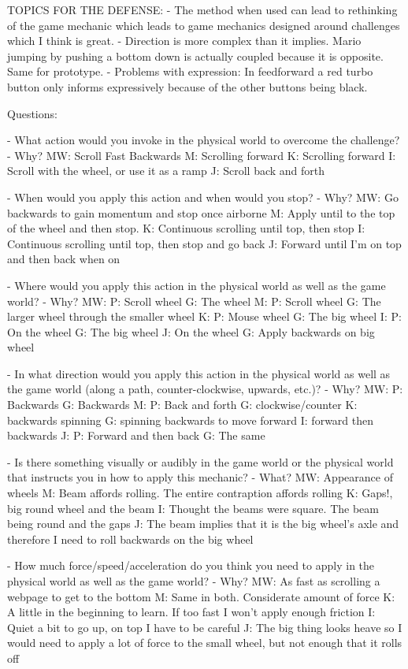 TOPICS FOR THE DEFENSE:
- The method when used can lead to rethinking of the game mechanic which leads to game mechanics designed around challenges which I think is great.
- Direction is more complex than it implies. Mario jumping by pushing a bottom down is actually coupled because it is opposite. Same for prototype.
- Problems with expression: In feedforward a red turbo button only informs expressively because of the other buttons being black.




 Questions:

  - What action would you invoke in the physical world to overcome the challenge?
   - Why?
   MW: Scroll Fast Backwards
   M: Scrolling forward
   K: Scrolling forward
   I: Scroll with the wheel, or use it as a ramp
   J: Scroll back and forth

    - When would you apply this action and when would you stop?
     - Why?
   MW: Go backwards to gain momentum and stop once airborne
   M: Apply until to the top of the wheel and then stop.
   K: Continuous scrolling until top, then stop
   I: Continuous scrolling until top, then stop and go back
   J: Forward until I'm on top and then back when on

    - Where would you apply this action in the physical world as well as the game world?
     - Why?
   MW: P: Scroll wheel G: The wheel
   M: P: Scroll wheel G: The larger wheel through the smaller wheel
   K: P: Mouse wheel G: The big wheel
   I: P: On the wheel G: The big wheel
   J: On the wheel G: Apply backwards on big wheel

    - In what direction would you apply this action in the physical world as well as the game world (along a path, counter-clockwise, upwards, etc.)?
     - Why?
   MW: P: Backwards G: Backwards
   M: P: Back and forth G: clockwise/counter
   K: backwards spinning G: spinning backwards to move forward
   I: forward then backwards
   J: P: Forward and then back G: The same

    - Is there something visually or audibly in the game world or the physical world that instructs you in how to apply this mechanic?
     - What?
   MW: Appearance of wheels
   M: Beam affords rolling. The entire contraption affords rolling
   K: Gaps!, big round wheel and the beam
   I: Thought the beams were square. The beam being round and the gaps
   J: The beam implies that it is the big wheel's axle and therefore I need to roll backwards on the big wheel

    - How much force/speed/acceleration do you think you need to apply in the physical world as well as the game world?
     - Why?
   MW: As fast as scrolling a webpage to get to the bottom
   M: Same in both. Considerate amount of force
   K: A little in the beginning to learn. If too fast I won't apply enough friction
   I: Quiet a bit to go up, on top I have to be careful
   J: The big thing looks heave so I would need to apply a lot of force to the small wheel, but not enough that it rolls off

